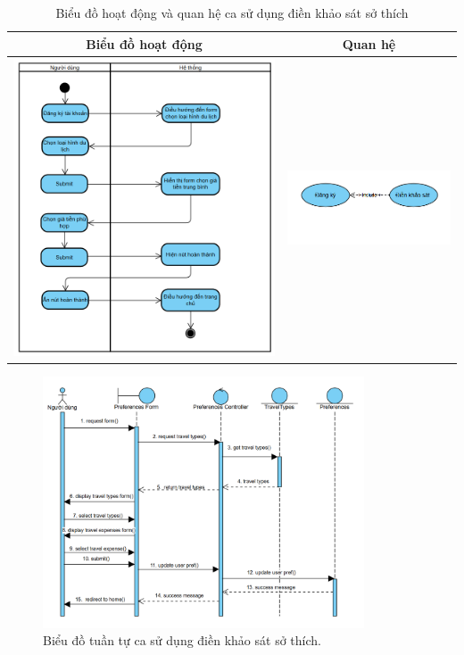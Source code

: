 \begin{table}[H] %
    \centering
    \caption{Biểu đồ hoạt động và quan hệ ca sử dụng điền khảo sát sở thích} %
    \label{tab:uc_survey_diagrams} %
    \begin{tabular}{| c | c |}
        \hline
        \textbf{Biểu đồ hoạt động} & \textbf{Quan hệ} \\
        \hline
        \includegraphics[width=0.5\linewidth]{figures/c3/3-3-3-ad.png}
        &
        \includegraphics[width=0.45\linewidth]{figures/c3/3-3-3-rd.png} \\
        \hline
    \end{tabular}
\end{table}


\begin{figure}[H]
    \centering
    \includegraphics[width=0.85\textwidth]{figures/c3/3-3-3-sd.png}
    \caption{Biểu đồ tuần tự ca sử dụng điền khảo sát sở thích.}
    \label{fig:3-3-3-sequence-diagram}
\end{figure}